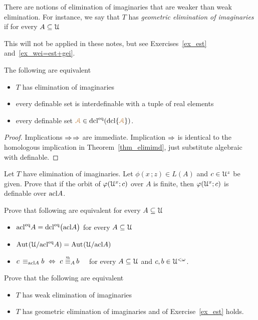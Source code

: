 There are notions of elimination of imaginaries that are weaker than weak elimination.
For instance, we say that $T$ has \emph{geometric elimination of imaginaries\/} if for every $A\subseteq\EuScript U$

\ceq{\hfill {\vl\Aa} }{\in}{{\acl}^\eq(\acl\{{\vl\Aa}\})}

This will not  be applied in these notes, but see Exercises~\ref{ex_est} and~\ref{ex_wei=est+gei}.

\begin{theorem}\label{elimimf} 
  The following are equivalent
  \begin{itemize}
  \item[1.] $T$ has elimination of imaginaries
  \item[2.] every definable set is interdefinable with a tuple of real elements
  \item[3.] every definable set ${\color{brown}\EuScript A}\in{\rm dcl}^{{\rm eq}}({\rm dcl}\{{\color{brown}\EuScript A}\})$.
  \end{itemize}
\end{theorem}

\begin{proof}
  Implications $\Rightarrow$$\Rightarrow$ are immediate.
  Implication $\Rightarrow$ is identical to the homologous implication in Theorem~\ref{thm_elimimd}, just substitute algebraic with definable.
\end{proof}

\begin{exercise}
  Let $T$ have elimination of imaginaries.
  Let $\phi(x\,;z)\in L(A)$ and  $c\in\EuScript U^z$ be given.
  Prove that if the orbit of $\varphi(\EuScript U^x; c)$ over $A$ is finite, then $\varphi(\EuScript U^x; c)$ is definable over ${\rm acl} A$.
\end{exercise}
  
\begin{exercise}\label{ex_est}
  Prove that following are equivalent for every $A\subseteq\EuScript U$
  \begin{itemize}
  \item[1.]  ${\rm acl}^{{\rm eq}} A={\rm dcl}^{{\rm eq}}\big({\rm acl} A\big)$ for every $A\subseteq\EuScript U$
  \item[2.]  ${\rm Aut\kern.15ex}(\EuScript U/{\rm acl}^{{\rm eq}} A)= {\rm Aut\kern.15ex}(\EuScript U/{\rm acl} A)$
  \item[3.] $c\,\equiv_{\acl A}b\ \IFF\ c\ \smash{\equivSh_A}\, b$ \ \ for every $A\subseteq\EuScript U$ and $c,b\in\EuScript U^{<\omega}$.
  \end{itemize} 
\end{exercise}
  
\begin{exercise}\label{ex_wei=est+gei}
  Prove that the following are equivalent
  \begin{itemize}
  \item[1.] $T$ has weak elimination of imaginaries
  \item[2.] $T$ has geometric elimination of imaginaries and  of Exercise~\ref{ex_est} holds.
  \end{itemize} 
\end{exercise}
  
